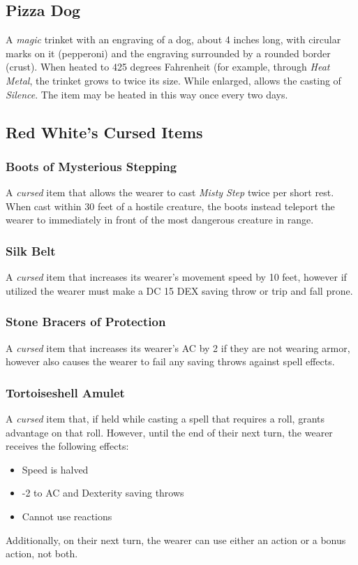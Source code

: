 \subsection{Pizza Dog}
\label{items:pizzadog}
A \textit{magic} trinket with an engraving of a dog, about 4 inches long, with circular marks on it (pepperoni) and the 	engraving surrounded by a rounded border (crust). When heated to 425 degrees Fahrenheit (for example, through \textit{Heat Metal}, the trinket grows to twice its size. While enlarged, allows the casting of \textit{Silence}. The item may be heated in this way once every two days.

\subsection{Red White's Cursed Items}

\subsubsection{Boots of Mysterious Stepping}
\label{items:boots}
A \textit{cursed} item that allows the wearer to cast \textit{Misty Step} twice per short rest. When cast within 30 feet of a hostile creature, the boots instead teleport the wearer to immediately in front of the most dangerous creature in range.


\subsubsection{Silk Belt}
\label{items:silkbelt}
A \textit{cursed} item that increases its wearer's movement speed by 10 feet, however if utilized the wearer must make a DC 15 DEX saving throw or trip and fall prone.

\subsubsection{Stone Bracers of Protection}
\label{items:bracers}
A \textit{cursed} item that increases its wearer's AC by 2 if they are not wearing armor, however also causes the wearer to fail any saving throws against spell effects.

\subsubsection{Tortoiseshell Amulet}
\label{items:tortoise}
A \textit{cursed} item that, if held while casting a spell that requires a roll, grants advantage on that roll. However, until the end of their next turn, the wearer receives the following effects:
\begin{itemize}
\item Speed is halved
\item -2 to AC and Dexterity saving throws
\item Cannot use reactions
\end{itemize}
Additionally, on their next turn, the wearer can use either an action or a bonus action, not both.

